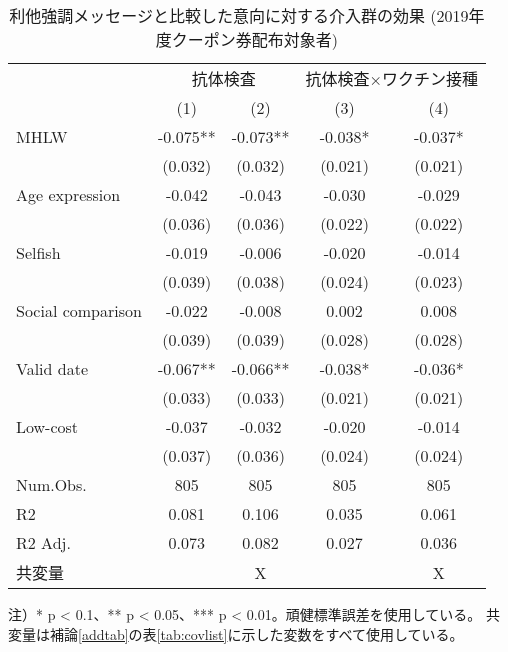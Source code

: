 \documentclass[
  11pt,
  a4paper,
]{article}
\begin{document}
\begin{table}

\caption{\label{tab:show-act-coupon1-altreg}利他強調メッセージと比較した意向に対する介入群の効果 (2019年度クーポン券配布対象者)}
\centering
\begin{threeparttable}
\begin{tabular}[t]{lcccc}
\toprule
\multicolumn{1}{c}{ } & \multicolumn{2}{c}{抗体検査} & \multicolumn{2}{c}{抗体検査×ワクチン接種} \\
\cmidrule(l{3pt}r{3pt}){2-3} \cmidrule(l{3pt}r{3pt}){4-5}
  & (1) & (2) & (3) & (4)\\
\midrule
MHLW & -0.075** & -0.073** & -0.038* & -0.037*\\
 & (0.032) & (0.032) & (0.021) & (0.021)\\
Age expression & -0.042 & -0.043 & -0.030 & -0.029\\
 & (0.036) & (0.036) & (0.022) & (0.022)\\
Selfish & -0.019 & -0.006 & -0.020 & -0.014\\
 & (0.039) & (0.038) & (0.024) & (0.023)\\
Social comparison & -0.022 & -0.008 & 0.002 & 0.008\\
 & (0.039) & (0.039) & (0.028) & (0.028)\\
Valid date & -0.067** & -0.066** & -0.038* & -0.036*\\
 & (0.033) & (0.033) & (0.021) & (0.021)\\
Low-cost & -0.037 & -0.032 & -0.020 & -0.014\\
 & (0.037) & (0.036) & (0.024) & (0.024)\\
\midrule
Num.Obs. & 805 & 805 & 805 & 805\\
R2 & 0.081 & 0.106 & 0.035 & 0.061\\
R2 Adj. & 0.073 & 0.082 & 0.027 & 0.036\\
共変量 &  & X &  & X\\
\bottomrule
\end{tabular}
\begin{tablenotes}
\item 注）* p < 0.1、** p < 0.05、*** p < 0.01。頑健標準誤差を使用している。 共変量は補論\ref{addtab}の表\ref{tab:covlist}に示した変数をすべて使用している。
\end{tablenotes}
\end{threeparttable}
\end{table}
\end{document}
